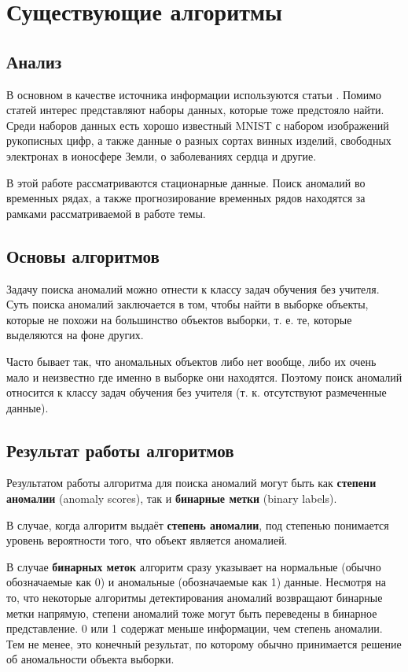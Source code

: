 \chapter{Существующие алгоритмы} \label{ch:ch2}

\section{Анализ} \label{sec:ch2/sec1}

В основном в качестве источника информации используются статьи \cite{dai, hodge, vakili, varun, billor, wilkinson}. Помимо статей интерес представляют наборы данных, которые тоже предстояло найти. Среди наборов данных есть хорошо известный MNIST с набором изображений рукописных цифр, а также данные о разных сортах винных изделий, свободных электронах в ионосфере Земли, о заболеваниях сердца и другие.

В этой работе рассматриваются стационарные данные. Поиск аномалий во временных рядах, а также прогнозирование временных рядов находятся за рамками рассматриваемой в работе темы.

\section{Основы алгоритмов} \label{sec:ch2/sec2}

Задачу поиска аномалий можно отнести к классу задач обучения без учителя. Суть поиска аномалий заключается в том, чтобы найти в выборке объекты, которые не похожи на большинство объектов выборки, т. е. те, которые выделяются на фоне других.

Часто бывает так, что аномальных объектов либо нет вообще, либо их очень мало и неизвестно где именно в выборке они находятся. Поэтому поиск аномалий относится к классу задач обучения без учителя (т. к. отсутствуют размеченные данные).

\section{Результат работы алгоритмов} \label{sec:ch1/sec2}

Результатом работы алгоритма для поиска аномалий могут быть как \textbf{степени аномалии} (anomaly scores), так и \textbf{бинарные метки} (binary labels).

В случае, когда алгоритм выдаёт \textbf{степень аномалии}, под степенью понимается уровень вероятности того, что объект является аномалией.

В случае \textbf{бинарных меток} алгоритм сразу указывает на нормальные (обычно обозначаемые как 0) и аномальные (обозначаемые как 1) данные. Несмотря на то, что некоторые алгоритмы детектирования аномалий возвращают бинарные метки напрямую, степени аномалий тоже могут быть переведены в бинарное представление. 0 или 1 содержат меньше информации, чем степень аномалии. Тем не менее, это конечный результат, по которому обычно принимается решение об аномальности объекта выборки.

